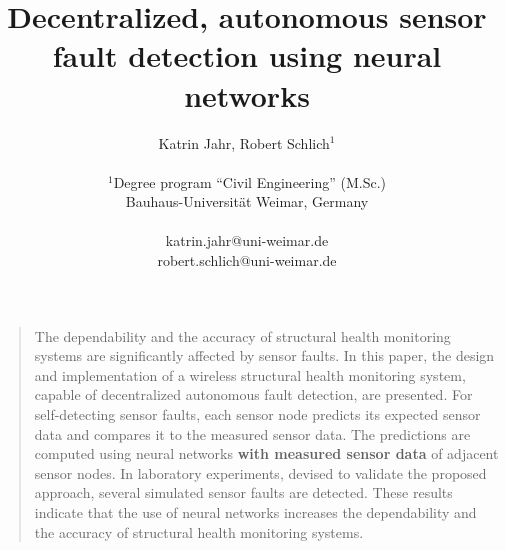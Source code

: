 \documentclass[12pt]{scrartcl}
\title{\textbf{ \Large{Decentralized, autonomous sensor fault detection using neural networks}} }
\author
{Katrin Jahr, Robert Schlich$^{1}$\\
\\
\normalsize{$^{1}$Degree program “Civil Engineering” (M.Sc.)}\\
\normalsize{Bauhaus-Universität Weimar, Germany}\\
\\
\normalsize{katrin.jahr@uni-weimar.de}\\
\normalsize{robert.schlich@uni-weimar.de}
}
\date{}
\newenvironment{sciabstract}{%
\begin{quote} \bf}
{\end{quote}}
\begin{document}
 


\baselineskip24pt


\maketitle 




\begin{sciabstract}


The dependability and the accuracy of structural health monitoring systems are significantly affected by sensor faults. 
In this paper, the design and implementation of a wireless structural health monitoring system, capable of decentralized autonomous fault detection, are presented. 
For self-detecting sensor faults, each sensor node predicts its expected sensor data and compares it to the measured sensor data. 
The predictions are computed using neural networks \textbf{with measured sensor data} of adjacent sensor nodes.
In laboratory experiments, devised to validate the proposed approach, several simulated sensor faults are detected.
These results indicate that the use of neural networks increases the dependability and the accuracy of structural health monitoring systems.





\end{sciabstract}
\end{document}
